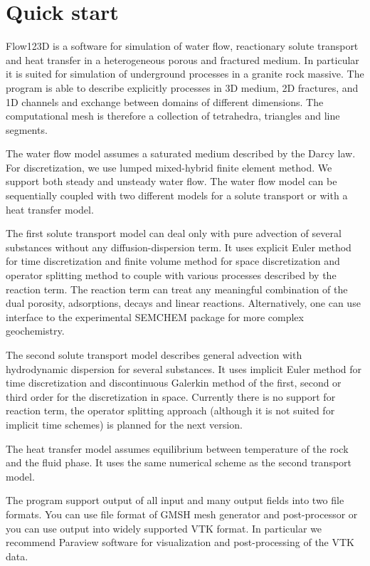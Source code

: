 \documentclass[a4paper]{article}
\begin{document}
\section{Quick start}

Flow123D is a software for simulation of water flow, reactionary solute transport and heat transfer in a heterogeneous 
porous and fractured medium. In particular it is suited for simulation of underground processes in a granite rock massive.
The program is able to describe explicitly processes in 3D medium, 2D fractures, and 1D channels and exchange between 
domains of different dimensions. The computational mesh is therefore a collection of tetrahedra, triangles and line segments.

The water flow model assumes a saturated medium described by the Darcy law. For discretization, we use lumped mixed-hybrid finite element method.
We support both steady and unsteady water flow. The water flow model can be sequentially coupled with two different models for a solute transport or with a heat transfer model.

The first solute transport model can deal only with pure advection of several substances without any diffusion-dispersion term. It uses 
explicit Euler method for time discretization and finite volume method for space discretization and operator splitting method to 
couple with various processes described by the reaction term. The reaction term can treat any meaningful combination of the dual porosity, adsorptions, decays and linear reactions.
Alternatively, one can use interface to the experimental SEMCHEM package for more complex geochemistry.

The second solute transport model describes general advection with hydrodynamic dispersion for several substances. It uses implicit Euler method for time discretization and discontinuous Galerkin method of
the first, second or third order for the discretization in space. Currently there is no support for reaction term, the operator splitting approach (although it is not suited for implicit time schemes) 
is planned for the next version.

The heat transfer model assumes equilibrium between temperature of the rock and the fluid phase. It uses the same numerical scheme as the second transport model.

The program support output of all input and many output fields into two file formats. You can use file format of GMSH mesh generator and post-processor 
or you can use output into widely supported VTK format. In particular we recommend Paraview software for visualization and post-processing of the VTK data.
\end{document}
